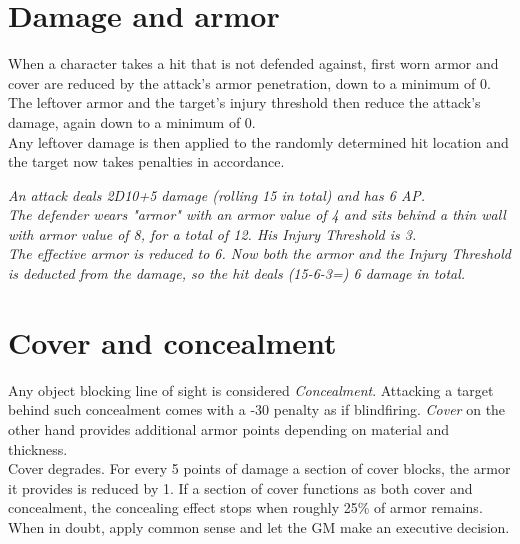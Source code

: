 \section{Damage and armor}
When a character takes a hit that is not defended against, first worn armor and cover are reduced by the attack's armor penetration, down to a minimum of 0. \\
The leftover armor and the target’s injury threshold then reduce the attack’s damage, again down to a minimum of 0. \\
Any leftover damage is then applied to the randomly determined hit location and the target now takes penalties in accordance.
\begin{exampleblock}
	\itshape
	An attack deals 2D10+5 damage (rolling 15 in total) and has 6 AP.\\
	The defender wears "armor" with an armor value of 4 and sits behind a thin wall with armor value of 8, for a total of 12. His Injury Threshold is 3.\\
	The effective armor is reduced to 6. Now both the armor and the Injury Threshold is deducted from the damage, so the hit deals (15-6-3=) 6 damage in total.
\end{exampleblock}
\section{Cover and concealment}
Any object blocking line of sight is considered \emph{Concealment}. Attacking a target behind such concealment comes with a -30 penalty as if blindfiring.
\emph{Cover} on the other hand provides additional armor points depending on material and thickness.
\\
Cover degrades. For every 5 points of damage a section of cover blocks, the armor it provides is reduced by 1. If a section of cover functions as both cover and concealment, the concealing effect stops when roughly 25\% of armor remains. When in doubt, apply common sense and let the GM make an executive decision.
